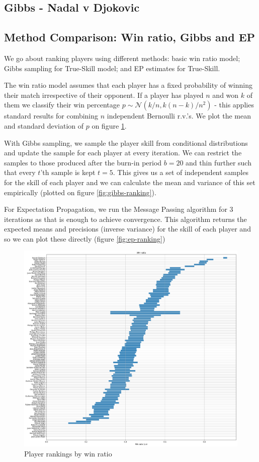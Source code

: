 \documentclass[]{article}
\newcommand{\Ncal}{\mathcal{N}}
\begin{document}
\subsection{Gibbs - Nadal v Djokovic}


\subsection{Method Comparison: Win ratio, Gibbs and EP}

We go about ranking players using different methods: basic win ratio model; Gibbs sampling for True-Skill model; and EP estimates for True-Skill.

The win ratio model assumes that each player has a fixed probability of winning their match irrespective of their opponent. If a player has played $n$ and won $k$ of them we classify their win percentage $p \sim \Ncal(k/n, k(n-k)/n^2)$ - this applies standard results for combining $n$ independent Bernoulli r.v.'s. We plot the mean and standard deviation of $p$ on figure \ref{fig:win-ratio-ranking}.

With Gibbs sampling, we sample the player skill from conditional distributions and update the sample for each player at every iteration. We can restrict the samples to those produced after the burn-in period $b=20$ and thin further such that every $t$'th sample is kept $t=5$. This gives us a set of independent samples for the skill of each player and we can calculate the mean and variance of this set empirically (plotted on figure \ref{fig:gibbs-ranking}).

For Expectation Propagation, we run the Message Passing algorithm for 3 iterations as that is enough to achieve convergence. This algorithm returns the expected means and precisions (inverse variance) for the skill of each player and so we can plot these directly (figure \ref{fig:ep-ranking})

\begin{figure}[!h]
	\centering
	\includegraphics[width=\linewidth]{win-ratio.png}
	\caption{Player rankings by win ratio}
	\label{fig:win-ratio-ranking}
\end{figure}
\end{document}
